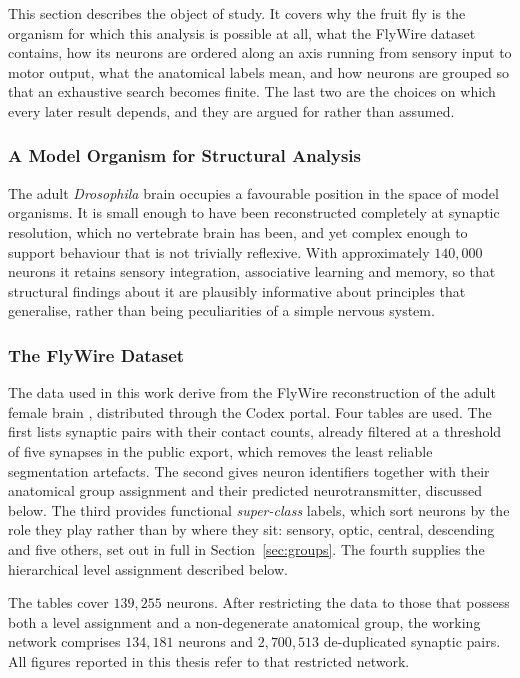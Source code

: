 \documentclass[12pt,a4paper,oneside]{article}
\theoremstyle{definition}
\theoremstyle{plain}
\newcommand{\Dros}{\textit{Drosophila}}
\begin{document}
This section describes the object of study. It covers why the fruit fly is
the organism for which this analysis is possible at all, what the FlyWire
dataset contains, how its neurons are ordered along an axis running from
sensory input to motor output, what the anatomical labels mean, and how
neurons are grouped so that an exhaustive search becomes finite. The last two
are the choices on which every later result depends, and they are argued for
rather than assumed.

\subsubsection{A Model Organism for Structural Analysis}

The adult \Dros{} brain occupies a favourable position in the space of model
organisms. It is small enough to have been reconstructed completely at
synaptic resolution, which no vertebrate brain has been, and yet complex
enough to support behaviour that is not trivially reflexive. With
approximately $140{,}000$ neurons it retains sensory integration,
associative learning and memory, so that structural findings about it are
plausibly informative about principles that generalise, rather than being
peculiarities of a simple nervous system.

\subsubsection{The FlyWire Dataset}
\label{sec:dataset}

The data used in this work derive from the FlyWire reconstruction of the
adult female brain \cite{lin2024}, distributed through the Codex portal.
Four tables are used. The first lists synaptic pairs with their contact
counts, already filtered at a threshold of five synapses in the public
export, which removes the least reliable segmentation artefacts. The second
gives neuron identifiers together with their anatomical group assignment and
their predicted neurotransmitter, discussed below. The third provides
functional \emph{super-class} labels, which sort neurons by the role they
play rather than by where they sit: sensory, optic, central, descending and
five others, set out in full in Section~\ref{sec:groups}. The fourth
supplies the hierarchical level assignment described below.

The tables cover $139{,}255$ neurons. After restricting the data to those
that possess both a level assignment and a non-degenerate anatomical group,
the working network comprises $134{,}181$ neurons and $2{,}700{,}513$
de-duplicated synaptic pairs. All
figures reported in this thesis refer to that restricted network.
\end{document}
